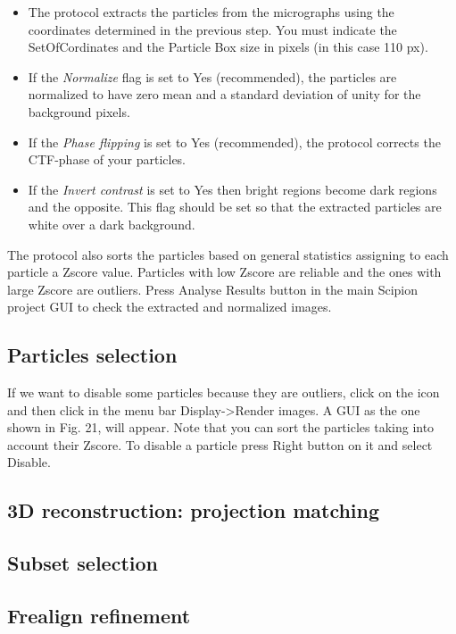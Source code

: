 \documentclass[12pt]{article} %
\begin{document}
 \begin{itemize}
  \item The protocol extracts the particles from the micrographs using the coordinates
        determined in the previous step. You must indicate the SetOfCordinates and the
        Particle Box size in pixels (in this case 110 px).
  \item If the \textit{Normalize} flag is set to Yes (recommended), the particles are
        normalized to have zero mean and a standard deviation of unity for the
        background pixels.
  \item If the \textit{Phase flipping} is set to Yes (recommended), the protocol corrects
        the CTF-phase of your particles.
  \item If the \textit{Invert contrast} is set to Yes then bright regions become dark
        regions and the opposite. This flag should be set so that the extracted particles
        are white over a dark background.
  
 \end{itemize}
 
 The protocol also sorts the particles based on general statistics assigning to each
 particle a Zscore value. Particles with low Zscore are reliable and the ones with
 large Zscore are outliers. Press Analyse Results button in the main Scipion project
 GUI to check the extracted and normalized images.

\subsection{Particles selection}
If we want to disable some particles because they are outliers, click on the icon and
then click in the menu bar Display->Render images. A GUI as the one shown in Fig. 21,
will appear. Note that you can sort the particles taking into account their Zscore.
To disable a particle press Right button on it and select Disable.

\subsection{3D reconstruction: projection matching}

\subsection{Subset selection}

\subsection{Frealign refinement}




\end{document}
